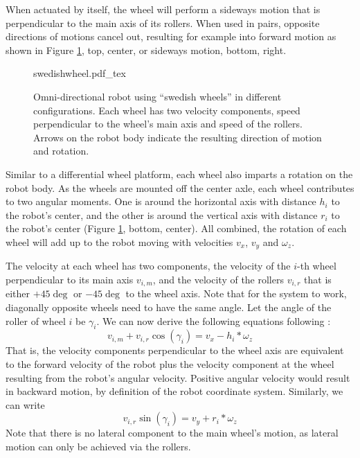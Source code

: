 When actuated by itself, the wheel will perform a sideways motion that is perpendicular to the main axis of its rollers. When used in pairs, opposite directions of motions cancel out, resulting for example into forward motion as shown in Figure \ref{fig:swedishwheel}, top, center, or sideways motion, bottom, right.


 \begin{figure}
    \centering
    \def\svgwidth{0.9\textwidth}
    {swedishwheel.pdf_tex}
    \caption{Omni-directional robot using ``swedish wheels'' in different configurations. Each wheel has two velocity components, speed perpendicular to the wheel's main axis and speed of the rollers. Arrows on the robot body indicate the resulting direction of motion and rotation. }
    \label{fig:swedishwheel}
\end{figure}

Similar to a differential wheel platform, each wheel also imparts a rotation on the robot body. As the wheels are mounted off the center axle, each wheel contributes to two angular moments. One is around the horizontal axis with distance $h_i$ to the robot's center, and the other is around the vertical axis with distance $r_i$ to the robot's center (Figure \ref{fig:swedishwheel}, bottom, center). All combined, the rotation of each wheel will add up to the robot moving with velocities $v_x$, $v_y$ and $\omega_z$.

The velocity at each wheel has two components, the velocity of the $i$-th wheel perpendicular to its main axis $v_{i,m}$, and the velocity of the rollers $v_{i,r}$ that is either $+45\deg$ or $-45\deg$ to the wheel axis. Note that for the system to work, diagonally opposite wheels need to have the same angle. Let the angle of the roller of wheel $i$ be $\gamma_i$. We can now derive the following equations following \cite{maulana2015inverse}:
\begin{equation}\label{eq:swedish1}
v_{i,m}+v_{i,r}\cos(\gamma_i) = v_x - h_i*\omega_z
\end{equation}
That is, the velocity components perpendicular to the wheel axis are equivalent to the forward velocity of the robot plus the velocity component at the wheel resulting from the robot's angular velocity. Positive angular velocity would result in backward motion, by definition of the robot coordinate system. Similarly, we can write
\begin{equation}\label{eq:swedish2}
v_{i,r}\sin(\gamma_i) = v_y+r_i*\omega_z
\end{equation}
Note that there is no lateral component to the main wheel's motion, as lateral motion can only be achieved via the rollers.

